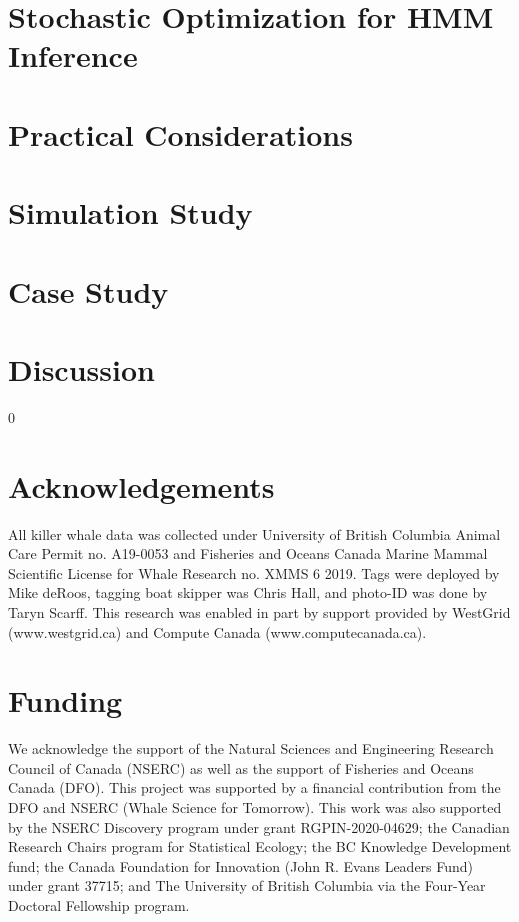 \documentclass[12pt]{article}
\newcommand{\blind}{0}
\begin{document}
\section{Stochastic Optimization for HMM Inference}


\section{Practical Considerations}

\label{sec:prac}

\section{Simulation Study}


\section{Case Study}


\section{Discussion}


\blind
\section*{Acknowledgements}
All killer whale data was collected under University of British Columbia Animal Care Permit no. A19-0053 and Fisheries and Oceans Canada Marine Mammal Scientific License for Whale Research no. XMMS 6 2019. Tags were deployed by Mike deRoos, tagging boat skipper was Chris Hall, and photo-ID was done by Taryn Scarff. This research was enabled in part by support provided by WestGrid (www.westgrid.ca) and Compute Canada (www.computecanada.ca). 

\section*{Funding}
We acknowledge the support of the Natural Sciences and Engineering Research Council of Canada (NSERC) as well as the support of Fisheries and Oceans Canada (DFO). This project was supported by a financial contribution from the DFO and NSERC (Whale Science for Tomorrow).
This work was also supported by the NSERC Discovery program under grant RGPIN-2020-04629; the Canadian Research Chairs program for Statistical Ecology; the BC Knowledge Development fund; the Canada Foundation for Innovation (John R. Evans Leaders Fund) under grant 37715; and The University of British Columbia via the Four-Year Doctoral Fellowship program.
\end{document}
